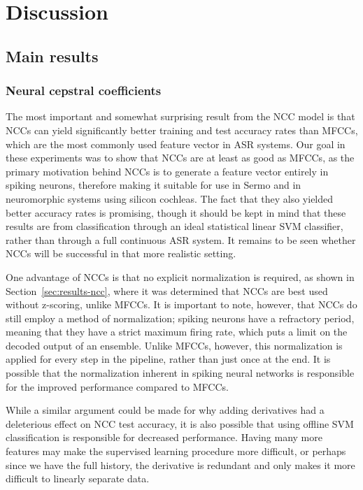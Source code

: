 \chapter{Discussion}
\label{chapt:discussion}

\section{Main results}

\subsection{Neural cepstral coefficients}

The most important and somewhat surprising result
from the NCC model
is that NCCs can yield significantly
better training and test accuracy rates than MFCCs,
which are the most commonly used
feature vector in ASR systems.
Our goal in these experiments was to
show that NCCs are at least as good as MFCCs,
as the primary motivation behind
NCCs is to generate a feature vector
entirely in spiking neurons,
therefore making it suitable
for use in Sermo
and in neuromorphic systems using
silicon cochleas.
The fact that they also yielded
better accuracy rates
is promising,
though it should be kept in mind
that these results
are from classification through
an ideal statistical linear SVM classifier,
rather than through
a full continuous ASR system.
It remains to be seen
whether NCCs will be successful
in that more realistic setting.

One advantage of NCCs is that
no explicit normalization is required,
as shown in Section~\ref{sec:results-ncc},
where it was determined
that NCCs are best used
without z-scoring, unlike MFCCs.
It is important to note, however,
that NCCs do still employ a method
of normalization;
spiking neurons have a refractory period,
meaning that they have a strict maximum firing rate,
which puts a limit on the
decoded output of an ensemble.
Unlike MFCCs, however,
this normalization is applied
for every step in the pipeline,
rather than just once at the end.
It is possible that
the normalization inherent in
spiking neural networks
is responsible for the improved performance
compared to MFCCs.

While a similar argument could be made
for why adding derivatives had
a deleterious effect on
NCC test accuracy,
it is also possible that
using offline SVM classification
is responsible for decreased performance.
Having many more features
may make the supervised learning procedure
more difficult,
or perhaps since we have the full history,
the derivative is redundant
and only makes it more difficult
to linearly separate data.


